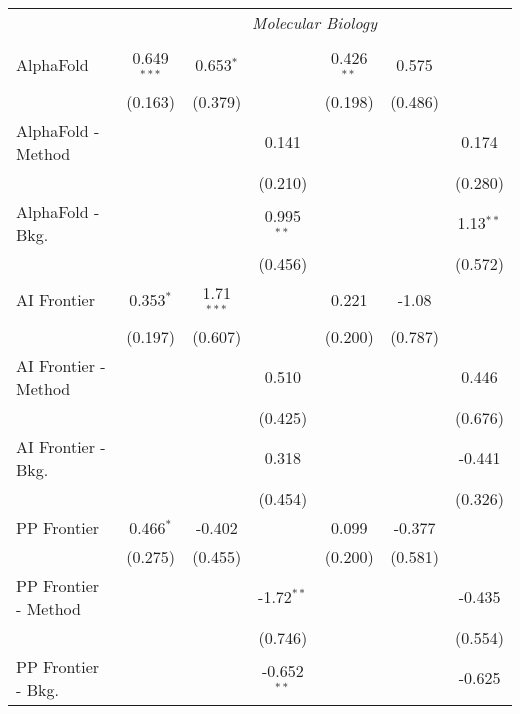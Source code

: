 \begin{tabular}{lcccccc}
 & \multicolumn{6}{c}{\textit{Molecular Biology}} \\ \\
   AlphaFold            & 0.649$^{***}$ & 0.653$^{*}$  &               & 0.426$^{**}$  & 0.575   &   \\   
                        & (0.163)       & (0.379)      &               & (0.198)       & (0.486) &   \\   
   AlphaFold - Method   &               &              & 0.141         &               &         & 0.174\\   
                        &               &              & (0.210)       &               &         & (0.280)\\   
   AlphaFold - Bkg.     &               &              & 0.995$^{**}$  &               &         & 1.13$^{**}$\\   
                        &               &              & (0.456)       &               &         & (0.572)\\   
   AI Frontier          & 0.353$^{*}$   & 1.71$^{***}$ &               & 0.221         & -1.08   &   \\   
                        & (0.197)       & (0.607)      &               & (0.200)       & (0.787) &   \\   
   AI Frontier - Method &               &              & 0.510         &               &         & 0.446\\   
                        &               &              & (0.425)       &               &         & (0.676)\\   
   AI Frontier - Bkg.   &               &              & 0.318         &               &         & -0.441\\   
                        &               &              & (0.454)       &               &         & (0.326)\\   
   PP Frontier          & 0.466$^{*}$   & -0.402       &               & 0.099         & -0.377  &   \\   
                        & (0.275)       & (0.455)      &               & (0.200)       & (0.581) &   \\   
   PP Frontier - Method &               &              & -1.72$^{**}$  &               &         & -0.435\\   
                        &               &              & (0.746)       &               &         & (0.554)\\   
   PP Frontier - Bkg.   &               &              & -0.652$^{**}$ &               &         & -0.625\\   

\end{tabular}
